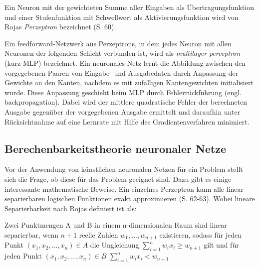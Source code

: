 \documentclass[
	12pt,
	a4paper,
	BCOR10mm,
	DIV14,
	listof=totoc,
	bibliography=totoc,
	headsepline
]{scrreprt}
\begin{document}
Ein Neuron mit der gewichteten Summe aller Eingaben als Übertragungsfunktion und einer Stufenfunktion mit Schwellwert als Aktivierungsfunktion wird von Rojas \textit{Perzeptron} bezeichnet \cite{Rojas:1996:NNS:235222} (S. 60).
\medskip

Ein feedforward-Netzwerk aus Perzeptrons, in dem jedes Neuron mit allen Neuronen der folgenden Schicht verbunden ist, wird als \textit{multilayer perceptron} (kurz MLP) bezeichnet.
Ein neuronales Netz lernt die Abbildung zwischen den vorgegebenen Paaren von Eingabe- und Ausgabedaten durch Anpassung der Gewichte an den Kanten, nachdem es mit zufälligen Kantengewichten initialisiert wurde.
Diese Anpassung geschieht beim MLP durch Fehlerrückführung (engl. backpropagation). Dabei wird der mittlere quadratische Fehler der berechneten Ausgabe gegenüber der vorgegebenen Ausgabe ermittelt und daraufhin unter Rücksichtnahme auf eine Lernrate mit Hilfe des Gradientenverfahren minimiert.

\subsection{Berechenbarkeitstheorie neuronaler Netze}
Vor der Anwendung von künstlichen neuronalen Netzen für ein Problem stellt sich die Frage, ob diese für das Problem geeignet sind. Dazu gibt es einige interessante mathematische Beweise.
Ein einzelnes Perzeptron kann alle linear separierbaren logischen Funktionen exakt approximieren \cite{Rojas:1996:NNS:235222} (S. 62-63). 
Wobei lineare Separierbarkeit nach Rojas definiert ist als:

Zwei Punktmengen A und B in einem n-dimensionalen Raum sind linear separierbar, wenn $n + 1$ reelle Zahlen $w_1,...,w_{n+1}$ existieren, sodass für jeden Punkt $(x_1,x_2,...,x_n) \in A$ die Ungleichung $\sum_{i=1}^{n} w_ix_i \ge w_{n+1}$ gilt und für jeden Punkt $(x_1,x_2,...,x_n) \in B$ $\sum_{i=1}^{n} w_ix_i < w_{n+1}$
\end{document}
